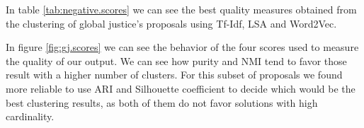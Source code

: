 In table \ref{tab:negative.scores} we can see the best quality measures obtained from the clustering of global justice's proposals using Tf-Idf, LSA and Word2Vec.



In figure \ref{fig:gj.scores} we can see the behavior of the four scores used to measure the quality of our output. We can see how purity and NMI tend to favor those result with a higher number of clusters. For this subset of proposals we found more reliable to use ARI and Silhouette coefficient to decide which would be the best clustering results, as both of them do not favor solutions with high cardinality.
